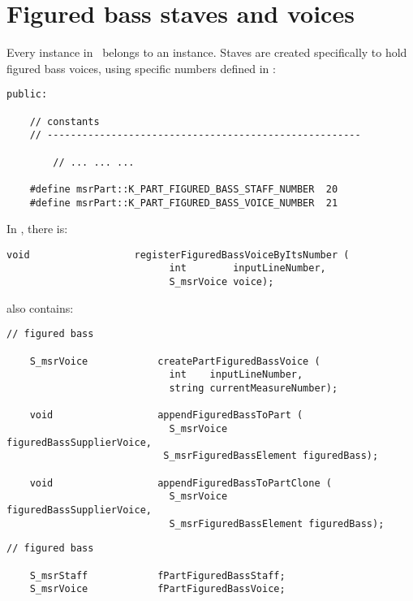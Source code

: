\section{Figured bass staves and voices}

Every  instance in \mf\ belongs to an  instance. Staves are created specifically to hold figured bass voices, using specific numbers defined in :
\begin{lstlisting}[language=CPlusPlus]
  public:

    // constants
    // ------------------------------------------------------

		// ... ... ...

    #define msrPart::K_PART_FIGURED_BASS_STAFF_NUMBER  20
    #define msrPart::K_PART_FIGURED_BASS_VOICE_NUMBER  21
\end{lstlisting}

In , there is:
\begin{lstlisting}[language=CPlusPlus]
     void                  registerFiguredBassVoiceByItsNumber (
                            int        inputLineNumber,
                            S_msrVoice voice);
\end{lstlisting}

 also contains:
\begin{lstlisting}[language=CPlusPlus]
    // figured bass

    S_msrVoice            createPartFiguredBassVoice (
                            int    inputLineNumber,
                            string currentMeasureNumber);

    void                  appendFiguredBassToPart (
                            S_msrVoice             figuredBassSupplierVoice,
                           S_msrFiguredBassElement figuredBass);

    void                  appendFiguredBassToPartClone (
                            S_msrVoice              figuredBassSupplierVoice,
                            S_msrFiguredBassElement figuredBass);
\end{lstlisting}

\begin{lstlisting}[language=CPlusPlus]
    // figured bass

    S_msrStaff            fPartFiguredBassStaff;
    S_msrVoice            fPartFiguredBassVoice;
\end{lstlisting}


